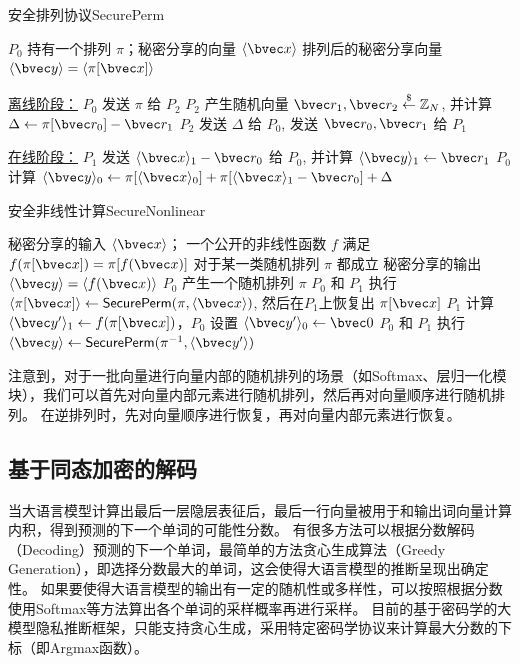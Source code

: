 \begin{algorithm}[H]
    \caption{安全排列协议\textsf{SecurePerm}}
    \label{alg:secure_perm}
    \begin{algorithmic}[1]
    \Require $P_0$ 持有一个排列 $\pi$；秘密分享的向量 $\langle \bvec x \rangle$
    \Ensure 排列后的秘密分享向量 $\langle \bvec y \rangle  = \langle \pi[\bvec x] \rangle$
    \item[\underline{离线阶段：}]
    \State $P_0$ 发送 $\pi$ 给 $P_2$
    \State $P_2$ 产生随机向量 $\bvec r_1, \bvec r_2 \stackrel{\$}{\gets} \mathbb Z_N $, 并计算 $\Delta \gets \pi[\bvec r_0] - \bvec r_1$
    \State $P_2$ 发送 $\Delta$ 给 $P_0$, 发送 $\bvec r_0, \bvec r_1$ 给 $P_1$
    \item[\underline{在线阶段：}]
    \State $P_1$ 发送 $\langle \bvec x \rangle_1 - \bvec r_0$ 给 $P_0$, 并计算 $\langle \bvec y \rangle_1 \gets \bvec r_1$
    \State $P_0$ 计算 $\langle \bvec y \rangle_0 \gets \pi[\langle \bvec x \rangle_0] + \pi[\langle \bvec x \rangle_1 - \bvec r_0] + \Delta$
    \end{algorithmic}
\end{algorithm}

\begin{algorithm}[h]
\caption{安全非线性计算\textsf{SecureNonlinear}}
\label{alg:perm-llm:nonlinear}
\begin{algorithmic}[1]
\Require  
    秘密分享的输入 $\langle \bvec x \rangle$；
    一个公开的非线性函数 $f$ 满足 $f(\pi[\bvec x]) = \pi[f(\bvec x)]$ 对于某一类随机排列 $\pi$ 都成立
\Ensure 秘密分享的输出 $\langle \bvec y \rangle = \langle f(\bvec x) \rangle$
\State $P_0$ 产生一个随机排列 $\pi$
\State $P_0$ 和 $P_1$ 执行 $\langle \pi[\bvec x] \rangle \gets \mathsf{SecurePerm}(\pi, \langle \bvec x \rangle)$, 然后在$P_1$上恢复出 $\pi[\bvec x]$
\State $P_1$ 计算 $\langle \bvec y' \rangle_1 \gets f(\pi[\bvec x])$，$P_0$ 设置 $\langle \bvec y' \rangle_0 \gets \bvec 0$
\State $P_0$ 和 $P_1$ 执行 $\langle \bvec y \rangle \gets \mathsf{SecurePerm}(\pi^{-1}, \langle \bvec y' \rangle)$
\end{algorithmic}
\end{algorithm}

注意到，对于一批向量进行向量内部的随机排列的场景（如Softmax、层归一化模块），我们可以首先对向量内部元素进行随机排列，然后再对向量顺序进行随机排列。
%
在逆排列时，先对向量顺序进行恢复，再对向量内部元素进行恢复。
%

\subsection{基于同态加密的解码}
当大语言模型计算出最后一层隐层表征后，最后一行向量被用于和输出词向量计算内积，得到预测的下一个单词的可能性分数。
%
有很多方法可以根据分数解码（Decoding）预测的下一个单词，最简单的方法贪心生成算法（Greedy Generation），即选择分数最大的单词，这会使得大语言模型的推断呈现出确定性。
%
如果要使得大语言模型的输出有一定的随机性或多样性，可以按照根据分数使用Softmax等方法算出各个单词的采样概率再进行采样。
%
目前的基于密码学的大模型隐私推断框架，只能支持贪心生成，采用特定密码学协议来计算最大分数的下标（即Argmax函数）。
%

